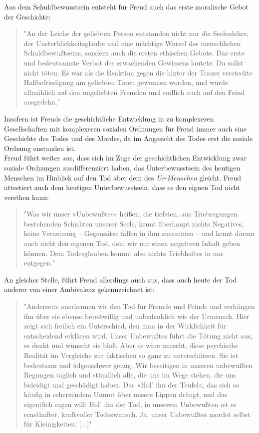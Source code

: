 \documentclass[11pt,a4paper,oneside,numbers=noenddot,bibliography=totocnumbered,DIV=13]{scrartcl}
\begin{document}
{Aus dem Schuldbewusstsein entsteht für Freud auch das erste moralische Gebot der Geschichte:
\begin{quote}
"An der Leiche der geliebten Person entstanden nicht nur die Seelenlehre, der Unsterblichkeitsglaube und eine mächtige Wurzel des menschlichen Schuldbewußtseins, sondern auch die ersten ethischen Gebote. Das erste und bedeutsamste Verbot des erwachenden Gewissens lautete: Du sollst nicht töten. Es war als die Reaktion gegen die hinter der Trauer versteckte Haßbefriedigung am geliebten Toten gewonnen worden, und wurde allmählich auf den ungeliebten Fremden und endlich auch auf den Feind ausgedehn." 
\end{quote}
Insofern ist Freuds die geschichtliche Entwicklung in zu komplexeren Gesellschaften mit komplexeren sozialen Ordnungen für Freud immer auch eine Geschichte des Todes und des Mordes, da im Angesicht des Todes erst die soziale Ordnung enstanden ist.\\
Freud führt weiter aus, dass sich im Zuge der geschichtlichen Entwicklung zwar soziale Ordnungen ausdifferenziert haben, das Unterbewusstsein des heutigen Menschen im Hinblick auf den Tod aber dem des \textit{Ur-Menschen} gleicht. Freud attestiert auch dem heutigen Unterbewusstsein, dass es den eignen Tod nicht versthen kann:
\begin{quote}
"Was wir unser »Unbewußtes« heißen, die tiefsten, aus Triebregungen bestehenden Schichten unserer Seele, kennt überhaupt nichts Negatives, keine Verneinung – Gegensätze fallen in ihm zusammen – und kennt darum auch nicht den eigenen Tod, dem wir nur einen negativen Inhalt geben können. Dem Todesglauben kommt also nichts Triebhaftes in uns entgegen." 
\end{quote}
 An gleicher Stelle, führt Freud allerdings auch aus, dass auch heute der Tod anderer von einer Ambivalenz gekennzeichnet ist:
 \begin{quote}
 "Anderseits anerkennen wir den Tod für Fremde und Feinde und verhängen ihn über sie ebenso bereitwillig und unbedenklich wie der Urmensch. Hier zeigt sich freilich ein Unterschied, den man in der Wirklichkeit für entscheidend erklären wird. Unser Unbewußtes führt die Tötung nicht aus, es denkt und wünscht sie bloß. Aber es wäre unrecht, diese psychische Realität im Vergleiche zur faktischen so ganz zu unterschätzen. Sie ist bedeutsam und folgenschwer genug. Wir beseitigen in unseren unbewußten Regungen täglich und stündlich alle, die uns im Wege stehen, die uns beleidigt und geschädigt haben. Das »Hol' ihn der Teufel«, das sich so häufig in scherzendem Unmut über unsere Lippen drängt, und das eigentlich sagen will: Hol' ihn der Tod, in unserem Unbewußten ist es ernsthafter, kraftvoller Todeswunsch. Ja, unser Unbewußtes mordet selbst für Kleinigkeiten; [...]" 

\end{quote}}
\end{document}
